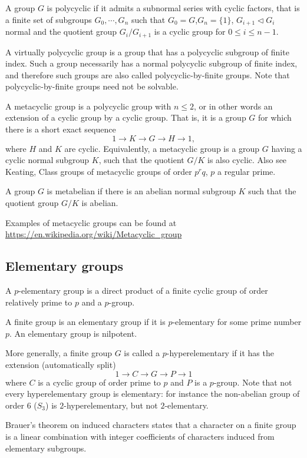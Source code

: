 \begin{definition}
	 A group $G$ is polycyclic if it admits a subnormal series with cyclic factors, that is a finite set of subgroups $G_0,\cdots,G_n$ such that $G_0=G$,$G_n=\{1\}$, $G_{i+1}\lhd G_i$ normal and the quotient group $G_i/G_{i+1}$ is a cyclic group for $0\leq i\leq n-1$.

	 A virtually polycyclic group is a group that has a polycyclic subgroup of finite index. Such a group necessarily has a normal polycyclic subgroup of finite index, and therefore such groups are also called polycyclic-by-finite groups. Note that polycyclic-by-finite groups need not be solvable.

	A metacyclic group is a polycyclic group with $n \leq 2$, or in other words an extension of a cyclic group by a cyclic group. That is, it is a group $G$ for which there is a short exact sequence
	\[1\rightarrow K\rightarrow G\rightarrow H\rightarrow 1,\]
	where $H$ and $K$ are cyclic. Equivalently, a metacyclic group is a group $G$ having a cyclic normal subgroup $K$, such that the quotient $G/K$ is also cyclic. Also see Keating, Class groups of metacyclic groups of order $p^rq$, $p$ a regular prime.

	A group $G$ is metabelian if there is an abelian normal subgroup $K$ such that the quotient group $G/K$ is abelian.
\end{definition}
Examples of metacyclic groups can be found at \url{https://en.wikipedia.org/wiki/Metacyclic_group}
\subsection{Elementary groups}
\begin{definition}
	A $p$-elementary group is a direct product of a finite cyclic group of order relatively prime to $p$ and a $p$-group. 

	A finite group is an elementary group if it is $p$-elementary for some prime number $p$. An elementary group is nilpotent.

	More generally, a finite group $G$ is called a $p$-hyperelementary if it has the extension (automatically split)
	\[ 1\longrightarrow C\longrightarrow G\longrightarrow P\longrightarrow 1\] 
	where $C$ is a cyclic group of order prime to $p$ and $P$ is a $p$-group. Note that not every hyperelementary group is elementary: for instance the non-abelian group of order $6$ ($S_3$) is $2$-hyperelementary, but not $2$-elementary.
\end{definition}
Brauer's theorem on induced characters states that a character on a finite group is a linear combination with integer coefficients of characters induced from elementary subgroups.

